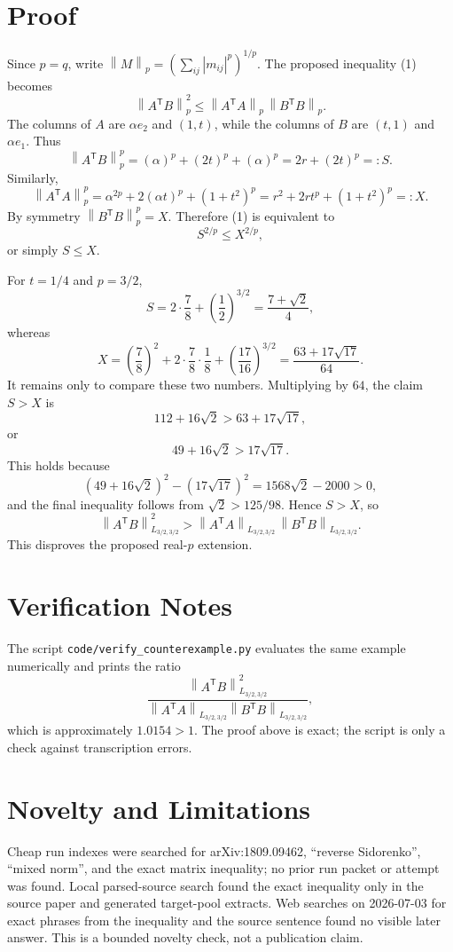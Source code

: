 \documentclass[11pt]{amsart}
\newcommand{\T}{\mathsf T}
\newcommand{\norm}[1]{\left\lVert #1\right\rVert}
\begin{document}
\section*{Proof}

Since \(p=q\), write \(\norm{M}_p=(\sum_{ij}|m_{ij}|^p)^{1/p}\).  The proposed
inequality (1) becomes
\[
  \norm{A^\T B}_p^2 \le \norm{A^\T A}_p\,\norm{B^\T B}_p.
\]
The columns of \(A\) are \(\alpha e_2\) and \((1,t)\), while the columns of
\(B\) are \((t,1)\) and \(\alpha e_1\).  Thus
\[
  \norm{A^\T B}_p^p
  =
  (\alpha)^p + (2t)^p + (\alpha)^p
  =
  2r+(2t)^p=:S.
\]
Similarly,
\[
  \norm{A^\T A}_p^p
  =
  \alpha^{2p}+2(\alpha t)^p+(1+t^2)^p
  =
  r^2+2rt^p+(1+t^2)^p=:X.
\]
By symmetry \(\norm{B^\T B}_p^p=X\).  Therefore (1) is equivalent to
\[
  S^{2/p}\le X^{2/p},
\]
or simply \(S\le X\).

For \(t=1/4\) and \(p=3/2\),
\[
  S=2\cdot\frac78+\left(\frac12\right)^{3/2}
   =\frac{7+\sqrt2}{4},
\]
whereas
\[
  X=\left(\frac78\right)^2
     +2\cdot\frac78\cdot\frac18
     +\left(\frac{17}{16}\right)^{3/2}
   =\frac{63+17\sqrt{17}}{64}.
\]
It remains only to compare these two numbers.  Multiplying by \(64\), the
claim \(S>X\) is
\[
  112+16\sqrt2 > 63+17\sqrt{17},
\]
or
\[
  49+16\sqrt2>17\sqrt{17}.
\]
This holds because
\[
  (49+16\sqrt2)^2-(17\sqrt{17})^2
  =
  1568\sqrt2-2000>0,
\]
and the final inequality follows from \(\sqrt2>125/98\).  Hence \(S>X\), so
\[
  \norm{A^\T B}_{L_{3/2,3/2}}^2
  >
  \norm{A^\T A}_{L_{3/2,3/2}}\,
  \norm{B^\T B}_{L_{3/2,3/2}}.
\]
This disproves the proposed real-\(p\) extension.

\section*{Verification Notes}

The script \texttt{code/verify\_counterexample.py} evaluates the same example
numerically and prints the ratio
\[
  \frac{\norm{A^\T B}_{L_{3/2,3/2}}^2}
       {\norm{A^\T A}_{L_{3/2,3/2}}\norm{B^\T B}_{L_{3/2,3/2}}},
\]
which is approximately \(1.0154>1\).  The proof above is exact; the script is
only a check against transcription errors.

\section*{Novelty and Limitations}

Cheap run indexes were searched for arXiv:1809.09462, ``reverse Sidorenko'',
``mixed norm'', and the exact matrix inequality; no prior run packet or
attempt was found.  Local parsed-source search found the exact inequality only
in the source paper and generated target-pool extracts.  Web searches on
2026-07-03 for exact phrases from the inequality and the source sentence found
no visible later answer.  This is a bounded novelty check, not a publication
claim.
\end{document}
